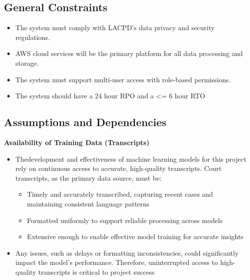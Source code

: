 \documentclass[12pt]{article}
\begin{document}
\subsection{General Constraints}
\begin{itemize}
  \item The system must comply with LACPD’s data privacy and security regulations.
  \item AWS cloud services will be the primary platform for all data processing and storage.
  \item The system must support multi-user access with role-based permissions.
  \item The system should have a 24 hour RPO and a <= 6 hour RTO
\end{itemize}

\subsection{Assumptions and Dependencies}
\textbf{ Availability of Training Data (Transcripts)}
\begin{itemize}
  \item Thedevelopment and effectiveness of machine learning models for this project rely on
 continuous access to accurate, high-quality transcripts. Court transcripts, as the primary data
 source, must be:
	\begin{itemize}
		\item   Timely and accurately transcribed, capturing recent cases and maintaining consistent language patterns
		\item  Formatted uniformly to support reliable processing across models
		\item Extensive enough to enable effective model training for accurate insights
	\end{itemize}
  \item  Any issues, such as delays or formatting inconsistencies, could significantly impact the
 model’s performance. Therefore, uninterrupted access to high-quality transcripts is critical to
 project success
\end{itemize}
\end{document}
